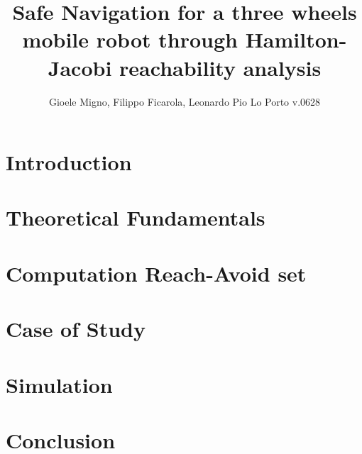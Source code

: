\documentclass[conference]{IEEEtran}
\begin{document}
    
    \title{Safe Navigation for a three wheels mobile robot through Hamilton-Jacobi reachability analysis}
    \author{Gioele Migno, Filippo Ficarola, Leonardo Pio Lo Porto \LARGE v.0628 }
    \maketitle
    
    
    
    \section{Introduction}
        \label{introduction}
        
    
    \section{Theoretical Fundamentals}
        \label{theoretical_fundamentals}
        
    
    \section{Computation Reach-Avoid set}
        \label{comp_ras}
        

    \section{Case of Study}
        \label{case_of_study}
        

    \section{Simulation}
        \label{simulation}
        
        
    \section{Conclusion}
        

    \clearpage
    \appendix
        

    \newpage
    
\end{document}
